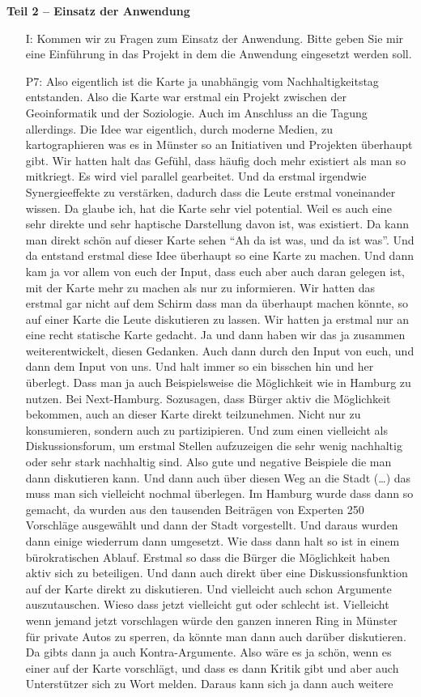 \textbf{Teil 2 -- Einsatz der Anwendung}
\begin{itemize}
    \item[I:] Kommen wir zu Fragen zum Einsatz der Anwendung. Bitte geben Sie mir eine Einf{\"u}hrung in das Projekt in dem die Anwendung eingesetzt werden soll.
    \item[P7:] Also eigentlich ist die Karte ja unabh{\"a}ngig vom Nachhaltigkeitstag entstanden. Also die Karte war erstmal ein Projekt zwischen der Geoinformatik und der Soziologie. Auch im Anschluss an die Tagung allerdings. Die Idee war eigentlich, durch moderne Medien, zu kartographieren was es in M{\"u}nster so an Initiativen und Projekten {\"u}berhaupt gibt. Wir hatten halt das Gef{\"u}hl, dass h{\"a}ufig doch mehr existiert als man so mitkriegt. Es wird viel parallel gearbeitet. Und da erstmal irgendwie Synergieeffekte zu verst{\"a}rken, dadurch dass die Leute erstmal voneinander wissen. Da glaube ich, hat die Karte sehr viel potential. Weil es auch eine sehr direkte und sehr haptische Darstellung davon ist, was existiert. Da kann man direkt sch{\"o}n auf dieser Karte sehen "`Ah da ist was, und da ist was"'. Und da entstand erstmal diese Idee {\"u}berhaupt so eine Karte zu machen. Und dann kam ja vor allem von euch der Input, dass euch aber auch daran gelegen ist, mit der Karte mehr zu machen als nur zu informieren. Wir hatten das erstmal gar nicht auf dem Schirm dass man da {\"u}berhaupt machen k{\"o}nnte, so auf einer Karte die Leute diskutieren zu lassen. Wir hatten ja erstmal nur an eine recht statische Karte gedacht. Ja und dann haben wir das ja zusammen weiterentwickelt, diesen Gedanken. Auch dann durch den Input von euch, und dann dem Input von uns. Und halt immer so ein bisschen hin und her {\"u}berlegt. Dass man ja auch Beispielsweise die M{\"o}glichkeit wie in Hamburg zu nutzen. Bei Next-Hamburg. Sozusagen, dass B{\"u}rger aktiv die M{\"o}glichkeit bekommen, auch an dieser Karte direkt teilzunehmen. Nicht nur zu konsumieren, sondern auch zu partizipieren. Und zum einen vielleicht als Diskussionsforum, um erstmal Stellen aufzuzeigen die sehr wenig nachhaltig oder sehr stark nachhaltig sind. Also gute und negative Beispiele die man dann diskutieren kann. Und dann auch {\"u}ber diesen Weg an die Stadt (\dots) das muss man sich vielleicht nochmal {\"u}berlegen. Im Hamburg wurde dass dann so gemacht, da wurden aus den tausenden Beitr{\"a}gen von Experten 250 Vorschl{\"a}ge ausgew{\"a}hlt und dann der Stadt vorgestellt. Und daraus wurden dann einige wiederrum dann umgesetzt. Wie dass dann halt so ist in einem b{\"u}rokratischen Ablauf. Erstmal so dass die B{\"u}rger die M{\"o}glichkeit haben aktiv sich zu beteiligen. Und dann auch direkt {\"u}ber eine Diskussionsfunktion auf der Karte direkt zu diskutieren. Und vielleicht auch schon Argumente auszutauschen. Wieso dass jetzt vielleicht gut oder schlecht ist. Vielleicht wenn jemand jetzt vorschlagen w{\"u}rde den ganzen inneren Ring in M{\"u}nster f{\"u}r private Autos zu sperren, da k{\"o}nnte man dann auch dar{\"u}ber diskutieren. Da gibts dann ja auch Kontra-Argumente. Also w{\"a}re es ja sch{\"o}n, wenn es einer auf der Karte vorschl{\"a}gt, und dass es dann Kritik gibt und aber auch Unterst{\"u}tzer sich zu Wort melden. Daraus kann sich ja dann auch weitere 
\end{itemize}
